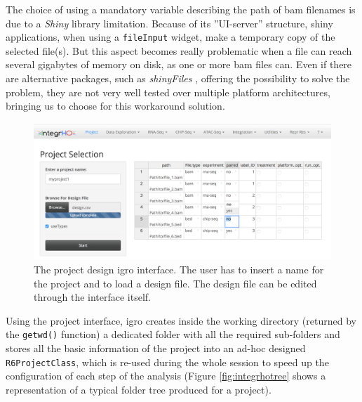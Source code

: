 The choice of using a mandatory variable describing the path of  \gls{bam} filenames is due to a \textit{Shiny} library limitation. 
Because of its ''UI-server'' structure, shiny applications, when using a \lstinline!fileInput! widget, make a temporary copy of the selected file(s).
But this aspect becomes really problematic when a file can reach several gigabytes of memory on disk, as one or more \gls{bam} files can.
Even if there are alternative packages, such as \textit{shinyFiles} \cite{Pedersen}, offering the possibility to solve the problem, they are not very well tested over multiple platform architectures, bringing us to choose for this workaround solution.

\begin{figure}[H]
\centering
\includegraphics[width=\textwidth, keepaspectratio]{img/integrho/design.png}
\caption[\gls{igro} design interface]{The project design \gls{igro} interface. The user has to insert a name for the project and to load a design file.
The design file can be edited through the interface itself.}
\label{fig:integrhodesign}
\end{figure}

Using the project interface, \gls{igro} creates inside the working directory (returned by the \lstinline!getwd()! function) a dedicated folder with all the required sub-folders and stores all the basic information of the project into an ad-hoc designed \lstinline!R6ProjectClass!, which is re-used during the whole session to speed up the configuration of each step of the analysis (Figure \ref{fig:integrhotree} shows a representation of a typical folder tree produced for a project).

